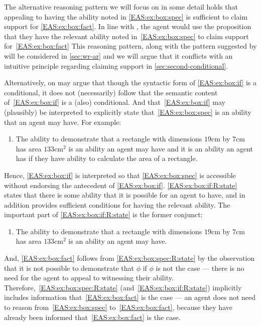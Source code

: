 \begin{note}[Alternatives]
  The alternative reasoning pattern we will focus on in some detail holds that appealing to having the ability noted in \ref{EAS:ex:box:spec} is sufficient to claim support for \ref{EAS:ex:box:fact}.
  In line with \ESU{}, the agent would use the proposition that they have the relevant ability noted in~\ref{EAS:ex:box:spec} to claim support for~\ref{EAS:ex:box:fact}
  This reasoning pattern, along with the pattern suggested by \EAS{} will be considered in \autoref{sec:wr-ar} and we will argue that it conflicts with an intuitive principle regarding claiming support in \ref{sec:second-conditional}.

  Alternatively, on may argue that though the syntactic form of \ref{EAS:ex:box:if} is a conditional, it does not (necessarily) follow that the semantic content of~\ref{EAS:ex:box:if} is a (also) conditional.
  And that~\ref{EAS:ex:box:if} may (plausibly) be interpreted to explicitly state that~\ref{EAS:ex:box:spec} is an ability that an agent may have.
  For example:
  \begin{enumerate}[label=\emph{A}\arabic*., ref=(\emph{A}\arabic*), resume*=EAS_counter]
  \item\label{EAS:ex:box:if:R:state} The ability to demonstrate that a rectangle with dimensions \(19\text{cm}\) by \(7\text{cm}\) has area \(133\text{cm}^{2}\) is an ability an agent may have and it is an ability an agent has if they have ability to calculate the area of a rectangle.
  \end{enumerate}
  Hence, \ref{EAS:ex:box:if} is interpreted so that \ref{EAS:ex:box:spec} is accessible without endorsing the antecedent of \ref{EAS:ex:box:if}.
  \ref{EAS:ex:box:if:R:state} states that there is some ability that it is possible for an agent to have, and in addition provides sufficient conditions for having the relevant ability.
  The important part of \ref{EAS:ex:box:if:R:state} is the former conjunct:
  \begin{enumerate}[label=\emph{A}\arabic*., ref=(\emph{A}\arabic*), resume*=EAS_counter]
  \item\label{EAS:ex:box:spec:R:state} The ability to demonstrate that a rectangle with dimensions \(19\text{cm}\) by \(7\text{cm}\) has area \(133\text{cm}^{2}\) is an ability an agent may have.
  \end{enumerate}
  And, \ref{EAS:ex:box:fact} follows from \ref{EAS:ex:box:spec:R:state} by the observation that it is not possible to demonstrate that \(\phi\) if \(\phi\) is not the case --- there is no need for the agent to appeal to witnessing their ability.
  Therefore,~\ref{EAS:ex:box:spec:R:state} (and~\ref{EAS:ex:box:if:R:state}) implicitly includes information that~\ref{EAS:ex:box:fact} is the case --- an agent does not need to reason from~\ref{EAS:ex:box:spec} to~\ref{EAS:ex:box:fact}, because they have already been informed that~\ref{EAS:ex:box:fact} is the case.


\end{note}
